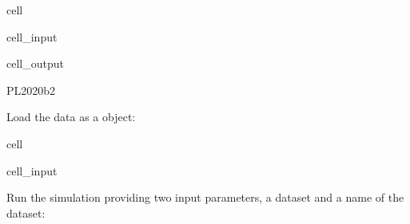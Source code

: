 \documentclass[letterpaper,10pt,english]{sphinxmanual}
\begin{document}
\begin{sphinxuseclass}{cell}
\begin{sphinxuseclass}{cell_input}
\begin{sphinxVerbatim}[commandchars=\\\{\}]
  \PYG{p}{[}\PYG{p}{]}\PYG{p}{[}\PYG{p}{]}\PYG{p}{[}\PYG{p}{]}
\end{sphinxVerbatim}

\end{sphinxuseclass}
\begin{sphinxuseclass}{cell_output}
\begin{sphinxVerbatim}[commandchars=\\\{\}]
\PYGZsq{}PL\PYGZus{}2020\PYGZus{}b2\PYGZsq{}
\end{sphinxVerbatim}

\end{sphinxuseclass}
\end{sphinxuseclass}
\sphinxAtStartPar
Load the data as a  object:

\begin{sphinxuseclass}{cell}
\begin{sphinxuseclass}{cell_input}
\begin{sphinxVerbatim}[commandchars=\\\{\}]
   
 
  
  
\end{sphinxVerbatim}

\end{sphinxuseclass}
\end{sphinxuseclass}
\sphinxAtStartPar
Run the simulation providing two input parameters, a  dataset and a name of the dataset:
\end{document}
